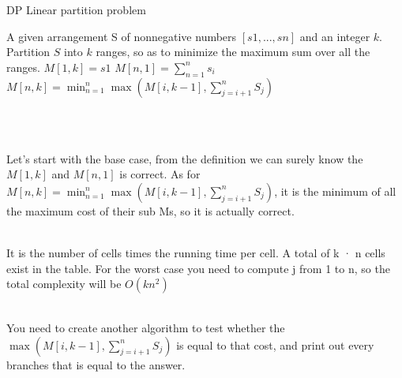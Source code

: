 \documentclass{article}
\begin{document}
\begin{algorithm}
    \caption{DP Linear partition problem}
    \begin{algorithmic}[1]
    \Require A given arrangement S of nonnegative numbers $[s1, . . . , sn]$ and an integer $k$.
    \Ensure Partition $S$ into $k$ ranges, so as to minimize the maximum sum over all the ranges.    
    \State $M[1, k] = s1$
    \State $M[n, 1] = \sum_{n=1}^n s_i$
    \State $M[n, k] = \min_{n=1}^n\max(M[i, k-1], \sum_{j=i+1}^n S_j)$
    \EndFunction
    \end{algorithmic}
\end{algorithm}
\\\\
Let's start with the base case, from the definition we can surely know the $M[1,k]$ and $M[n, 1]$ is correct.
As for $M[n, k] = \min_{n=1}^n\max(M[i, k-1], \sum_{j=i+1}^n S_j)$, it is the minimum of all the maximum cost of their sub Ms, so it is actually correct.
\\\\
It is the number of cells times the running time per cell.
A total of k · n cells exist in the table.
For the worst case you need to compute j from 1 to n, so the total complexity will be $O(kn^2)$
\\\\
You need to create another algorithm to test whether the $\max(M[i, k-1], \sum_{j=i+1}^n S_j)$ is equal to that cost, and print out every branches that is equal to the answer.
\\\\
\end{document}

